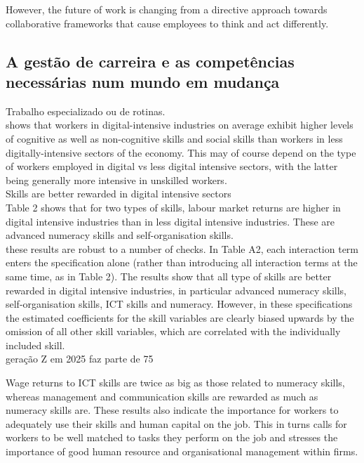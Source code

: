 However, the future of work is changing from a directive approach towards collaborative frameworks that cause employees to think and act differently.



\newpage
\subsection{A gestão de carreira e as competências necessárias num mundo em mudança}



Trabalho especializado ou de rotinas.\\

shows that workers in digital-intensive industries on average exhibit higher levels of cognitive as well as non-cognitive skills and social skills than workers in less digitally-intensive sectors of the economy. This may of course depend on the type of workers employed in digital vs less digital intensive sectors, with the latter being generally more intensive in unskilled workers.\\

Skills are better rewarded in digital intensive sectors\\

Table 2 shows that for two types of skills, labour market returns are higher in digital intensive industries than in less digital intensive industries. These are advanced numeracy skills and self-organisation skills.\\

these results are robust to a number of checks. In Table A2, each interaction term enters the specification alone (rather than introducing all interaction terms at the same time, as in Table 2). The results show that all type of skills are better rewarded in digital intensive industries, in particular advanced numeracy skills, self-organisation skills, ICT skills and numeracy. However, in these specifications the estimated coefficients for the skill variables are clearly biased upwards by the omission of all other skill variables, which are correlated with the individually included skill.\\

geração Z em 2025 faz parte de 75%

Wage returns to ICT skills are twice as big as those related to numeracy skills, whereas management and communication skills are rewarded as much as numeracy skills are. These results also indicate the importance for workers to adequately use their skills and human capital on the job. This in turns calls for workers to be well matched to tasks they perform on the job and stresses the importance of good human resource and organisational management within firms.

